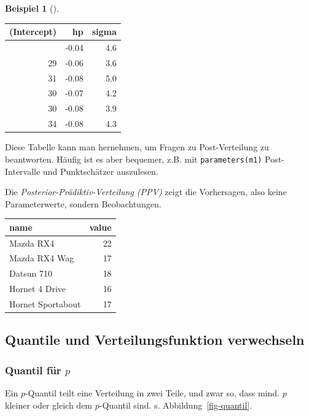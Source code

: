 \documentclass[
  ngerman,
  letterpaper,
  twoside,
  open=any]{scrbook}
\newcounter{none} %
\theoremstyle{definition}
\newtheorem{example}{Beispiel}[chapter]
\theoremstyle{plain}
\theoremstyle{definition}
\theoremstyle{definition}
\theoremstyle{remark}
\begin{document}
\begin{example}[]
{\begin{longtable}[]{@{}rrr@{}}
\toprule\noalign{}
(Intercept) & hp & sigma \\
\midrule\noalign{}
\endhead
\bottomrule\noalign{}
\endlastfoot
25 & -0.04 & 4.6 \\
29 & -0.06 & 3.6 \\
31 & -0.08 & 5.0 \\
30 & -0.07 & 4.2 \\
30 & -0.08 & 3.9 \\
34 & -0.08 & 4.3 \\

\end{longtable}

}

Diese Tabelle kann man hernehmen, um Fragen zu Post-Verteilung zu
beantworten. Häufig ist es aber bequemer, z.B. mit
\texttt{parameters(m1)} Post-Intervalle und Punktschätzer auszulesen.

Die \emph{Posterior-Prädiktiv-Verteilung (PPV)} zeigt die Vorhersagen,
also keine Parameterwerte, sondern Beobachtungen.

{\def\LTcaptype{none} %
\begin{longtable}[]{@{}lr@{}}
\toprule\noalign{}
name & value \\
\midrule\noalign{}
\endhead
\bottomrule\noalign{}
\endlastfoot
Mazda RX4 & 22 \\
Mazda RX4 Wag & 17 \\
Datsun 710 & 18 \\
Hornet 4 Drive & 16 \\
Hornet Sportabout & 17 \\
\end{longtable}
}

\subsection{Quantile und Verteilungsfunktion
verwechseln}\label{quantile-und-verteilungsfunktion-verwechseln}

\subsubsection{\texorpdfstring{Quantil für
\(p\)}{Quantil für p}}\label{quantil-fuxfcr-p}

Ein \(p\)-Quantil teilt eine Verteilung in zwei Teile, und zwar so, dass
mind. \(p\) kleiner oder gleich dem \(p\)-Quantil sind. s.
Abbildung~\ref{fig-quantil}.

\begin{figure}[H]


\end{figure}
\end{example}
\end{document}
